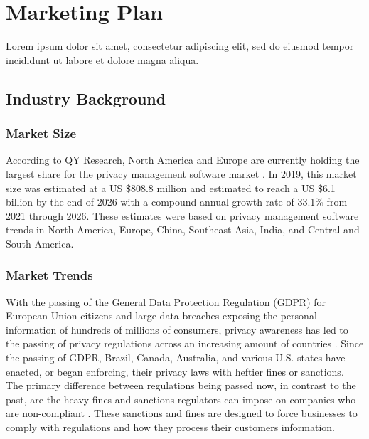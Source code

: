 {\let\cleardoublepage\relax \chapter{Marketing Plan}}


Lorem ipsum dolor sit amet, consectetur adipiscing elit, sed do eiusmod tempor incididunt ut labore et dolore magna aliqua.


\section{Industry Background}

\subsection{Market Size}

According to QY Research, North America and Europe are currently holding the largest share for the privacy management software market \cite{qy.2020}. In 2019, this market size was estimated at a US \$808.8 million and estimated to reach a US \$6.1 billion by the end of 2026 with a compound annual growth rate of 33.1\% from 2021 through 2026. These estimates were based on privacy management software trends in North America, Europe, China, Southeast Asia, India, and Central and South America.

\subsection{Market Trends}

With the passing of the General Data Protection Regulation (GDPR) for European Union citizens and large data breaches exposing the personal information of hundreds of millions of consumers, privacy awareness has led to the passing of privacy regulations across an increasing amount of countries \cite{privacypolicies.2019}. Since the passing of GDPR, Brazil, Canada, Australia, and various U.S. states have enacted, or began enforcing, their privacy laws with heftier fines or sanctions. The primary difference between regulations being passed now, in contrast to the past, are the heavy fines and sanctions regulators can impose on companies who are non-compliant \cite{tr.2020}. These sanctions and fines are designed to force businesses to comply with regulations and how they process their customers information.

